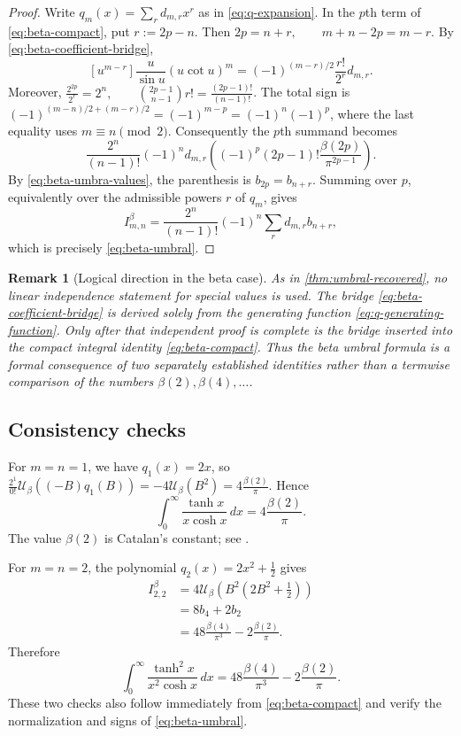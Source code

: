 \documentclass[11pt,twoside]{article}
\newtheorem{remark}[theorem]{Remark}
\numberwithin{equation}{section}
\begin{document}
\begin{proof}
Write $q_m(x)=\sum_r d_{m,r}x^r$ as in
\eqref{eq:q-expansion}.  In the $p$th term of
\eqref{eq:beta-compact}, put
\(r:=2p-n\).
Then
\(2p=n+r, \qquad m+n-2p=m-r\).
By \eqref{eq:beta-coefficient-bridge},
\[
[u^{m-r}]\frac{u}{\sin u}(u\cot u)^m
=
(-1)^{(m-r)/2}\frac{r!}{2^r}d_{m,r}.
\]
Moreover,
\(\frac{2^{2p}}{2^r}=2^n, \qquad \binom{2p-1}{n-1}r! =\frac{(2p-1)!}{(n-1)!}\).
The total sign is
\((-1)^{(m-n)/2+(m-r)/2} =(-1)^{m-p} =(-1)^n(-1)^p\),
where the last equality uses $m\equiv n\pmod2$.  Consequently the
$p$th summand becomes
\[
\frac{2^n}{(n-1)!}
(-1)^n d_{m,r}
\left(
(-1)^p(2p-1)!\frac{\beta(2p)}{\pi^{2p-1}}
\right).
\]
By \eqref{eq:beta-umbra-values}, the parenthesis is $b_{2p}=b_{n+r}$.
Summing over $p$, equivalently over the admissible powers $r$ of
$q_m$, gives
\[
I_{m,n}^{\beta}
=\frac{2^n}{(n-1)!}(-1)^n
\sum_r d_{m,r}b_{n+r},
\]
which is precisely \eqref{eq:beta-umbral}.
\end{proof}

\begin{remark}[Logical direction in the beta case]
As in \cref{thm:umbral-recovered}, no linear independence statement for
special values is used.  The bridge
\eqref{eq:beta-coefficient-bridge} is derived solely from the generating
function \eqref{eq:q-generating-function}.  Only after that independent
proof is complete is the bridge inserted into the compact integral
identity \eqref{eq:beta-compact}.  Thus the beta umbral formula is a
formal consequence of two separately established identities rather
than a termwise comparison of the numbers
$\beta(2),\beta(4),\ldots$.
\end{remark}

\subsection{Consistency checks}

For $m=n=1$, we have $q_1(x)=2x$, so \(\frac{2^1}{0!}\mathcal U_\beta\!\left((-B)q_1(B)\right)=-4\mathcal U_\beta(B^2)=4\frac{\beta(2)}{\pi}\).
Hence
\begin{equation}
\label{eq:beta-check-11}
\boxed{
\int_0^\infty\frac{\tanh x}{x\cosh x}\,dx
=4\frac{\beta(2)}{\pi}.
}
\end{equation}
The value $\beta(2)$ is Catalan's constant; see
\cite{WeissteinBeta,Zudilin2019}.

For $m=n=2$, the polynomial $q_2(x)=2x^2+\tfrac12$ gives
\begin{align*}
I_{2,2}^{\beta}
&=4\mathcal U_\beta\!\left(B^2\left(2B^2+\frac12\right)\right)\\
&=8b_4+2b_2\\
&=48\frac{\beta(4)}{\pi^3}
-2\frac{\beta(2)}{\pi}.
\end{align*}
Therefore
\begin{equation}
\label{eq:beta-check-22}
\boxed{
\int_0^\infty\frac{\tanh^2x}{x^2\cosh x}\,dx
=48\frac{\beta(4)}{\pi^3}
-2\frac{\beta(2)}{\pi}.
}
\end{equation}
These two checks also follow immediately from
\eqref{eq:beta-compact} and verify the normalization and signs of
\eqref{eq:beta-umbral}.
\end{document}
